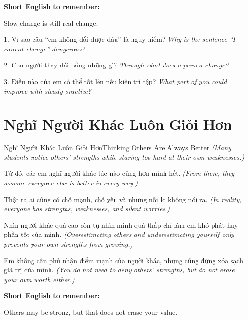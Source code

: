 \begin{ghinhoanh}
\textbf{Short English to remember:}

Slow change is still real change.

\end{ghinhoanh}

\begin{tuhocnhanh}
1. Vì sao câu “em không đổi được đâu” là nguy hiểm? \textit{Why is the sentence “I cannot change” dangerous?}

2. Con người thay đổi bằng những gì? \textit{Through what does a person change?}

3. Điều nào của em có thể tốt lên nếu kiên trì tập? \textit{What part of you could improve with steady practice?}
\end{tuhocnhanh}
\ngancach

\section{Nghĩ Người Khác Luôn Giỏi Hơn}
\begin{truyen}{Nghĩ Người Khác Luôn Giỏi Hơn}{Thinking Others Are Always Better}
\textit{(Many students notice others' strengths while staring too hard at their own weaknesses.)}

Từ đó, các em nghĩ người khác lúc nào cũng hơn mình hết.
\textit{(From there, they assume everyone else is better in every way.)}

Thật ra ai cũng có chỗ mạnh, chỗ yếu và những nỗi lo không nói ra.
\textit{(In reality, everyone has strengths, weaknesses, and silent worries.)}

Nhìn người khác quá cao còn tự nhìn mình quá thấp chỉ làm em khó phát huy phần tốt của mình.
\textit{(Overestimating others and underestimating yourself only prevents your own strengths from growing.)}
\end{truyen}

\begin{baihoc}
Em không cần phủ nhận điểm mạnh của người khác, nhưng cũng đừng xóa sạch giá trị của mình.
\textit{(You do not need to deny others' strengths, but do not erase your own worth either.)}
\end{baihoc}

\begin{ghinhoanh}
\textbf{Short English to remember:}

Others may be strong, but that does not erase your value.

\end{ghinhoanh}


